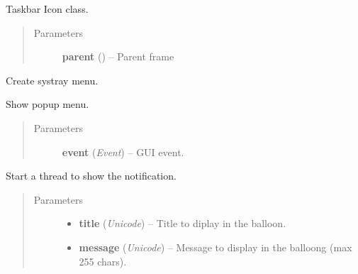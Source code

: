\documentclass[letterpaper,10pt,english]{sphinxmanual}
\begin{document}
\begin{fulllineitems}
\label{graphicaldesign:graphicaldesign.SysTray}
Taskbar Icon class.
\begin{quote}\begin{description}
\item[{Parameters}] \leavevmode
\textbf{parent} () -- Parent frame

\end{description}\end{quote}

\begin{fulllineitems}
\label{graphicaldesign:graphicaldesign.SysTray.CreateMenu}
Create systray menu.

\end{fulllineitems}


\begin{fulllineitems}
\label{graphicaldesign:graphicaldesign.SysTray.ShowMenu}
Show popup menu.
\begin{quote}\begin{description}
\item[{Parameters}] \leavevmode
\textbf{event} (\emph{Event}) -- GUI event.

\end{description}\end{quote}

\end{fulllineitems}


\begin{fulllineitems}
\label{graphicaldesign:graphicaldesign.SysTray.ShowNotification}
Start a thread to show the notification.
\begin{quote}\begin{description}
\item[{Parameters}] \leavevmode\begin{itemize}
\item {} 
\textbf{title} (\emph{Unicode}) -- Title to diplay in the balloon.

\item {} 
\textbf{message} (\emph{Unicode}) -- Message to display in the balloong (max 255 chars).

\end{itemize}

\end{description}\end{quote}

\end{fulllineitems}


\end{fulllineitems}
\end{document}
